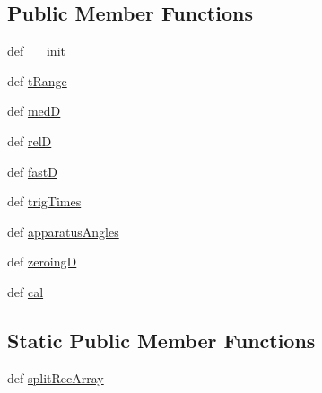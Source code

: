 \subsection*{Public Member Functions}
\begin{DoxyCompactItemize}
\item 
def \hyperlink{classrepo_1_1programs_1_1pythonpackages_1_1pr_1_1LVProcess_1_1SPDataSet_afdb93f61c5279757d6cd4b232f8c1e80}{\-\_\-\-\_\-init\-\_\-\-\_\-}
\item 
def \hyperlink{classrepo_1_1programs_1_1pythonpackages_1_1pr_1_1LVProcess_1_1SPDataSet_ac849f9de3ee99b20ea1d70cdde26d83d}{t\-Range}
\item 
def \hyperlink{classrepo_1_1programs_1_1pythonpackages_1_1pr_1_1LVProcess_1_1SPDataSet_a17fbf7263f629c52b576fc634e88e90a}{med\-D}
\item 
def \hyperlink{classrepo_1_1programs_1_1pythonpackages_1_1pr_1_1LVProcess_1_1SPDataSet_a402eece5efaf96935876694b8ba4d8d8}{rel\-D}
\item 
def \hyperlink{classrepo_1_1programs_1_1pythonpackages_1_1pr_1_1LVProcess_1_1SPDataSet_a2af24a6116ba11d8d19a7847a2677b50}{fast\-D}
\item 
def \hyperlink{classrepo_1_1programs_1_1pythonpackages_1_1pr_1_1LVProcess_1_1SPDataSet_aa37adb017bf860be452471575a4ccfdf}{trig\-Times}
\item 
def \hyperlink{classrepo_1_1programs_1_1pythonpackages_1_1pr_1_1LVProcess_1_1SPDataSet_af6104662e20721e8ef5c0ec76a2e8a64}{apparatus\-Angles}
\item 
def \hyperlink{classrepo_1_1programs_1_1pythonpackages_1_1pr_1_1LVProcess_1_1SPDataSet_a5f9f02968e014d35f8527391c0367109}{zeroing\-D}
\item 
def \hyperlink{classrepo_1_1programs_1_1pythonpackages_1_1pr_1_1LVProcess_1_1SPDataSet_a5615c7621f4730b851ad2b61c0ca2fbe}{cal}
\end{DoxyCompactItemize}
\subsection*{Static Public Member Functions}
\begin{DoxyCompactItemize}
\item 
def \hyperlink{classrepo_1_1programs_1_1pythonpackages_1_1pr_1_1LVProcess_1_1SPDataSet_a835999cd5a3072d1c2f8fd9e5ea4223c}{split\-Rec\-Array}
\end{DoxyCompactItemize}
